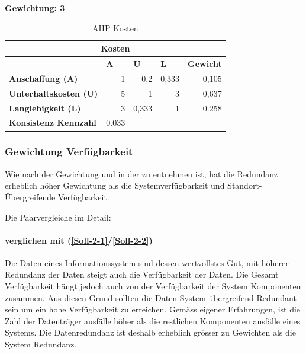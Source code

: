 \textbf{Gewichtung: 3}

\begin{table}[htbp]
\caption{AHP Kosten}
\begin{tabular}{|l|r|l|l|l|}
\hline
\multicolumn{ 5}{|c|}{\textbf{Kosten}} \\ \hline
 & \multicolumn{1}{l|}{\textbf{A}} & \textbf{U} & \textbf{L} & \textbf{Gewicht} \\ \hline
\textbf{Anschaffung (A)} & 1 & \multicolumn{1}{r|}{0,2} & \multicolumn{1}{r|}{0,333} & \multicolumn{1}{r|}{0,105} \\ \hline
\textbf{Unterhaltskosten (U)} & 5 & \multicolumn{1}{r|}{1} & \multicolumn{1}{r|}{3} & \multicolumn{1}{r|}{0,637} \\ \hline
\textbf{Langlebigkeit (L)} & 3 & \multicolumn{1}{r|}{0,333} & \multicolumn{1}{r|}{1} & \multicolumn{1}{r|}{0.258} \\ \hline
\textbf{Konsistenz Kennzahl} & 0.033 \\ \cline{1-2}
\end{tabular}
\label{tab:AHPKosten}
\end{table}

\subsubsection{Gewichtung Verfügbarkeit}

Wie nach der Gewichtung und in der  zu entnehmen ist, hat die Redundanz erheblich höher Gewichtung als die Systemverfügbarkeit und Standort-Übergreifende Verfügbarkeit.

Die Paarvergleiche im Detail:

\paragraph*{ verglichen mit  (\ref{Soll-2-1}/\ref{Soll-2-2})}
Die Daten eines Informationssystem sind dessen wertvollstes Gut, mit höherer Redundanz der Daten steigt auch die Verfügbarkeit der Daten.
Die Gesamt Verfügbarkeit hängt jedoch auch von der Verfügbarkeit der System Komponenten zusammen. Aus diesen Grund sollten die Daten System übergreifend Redundant sein um ein hohe Verfügbarkeit zu erreichen. Gemäss eigener Erfahrungen, ist die Zahl der Datenträger ausfälle höher als die restlichen Komponenten ausfälle eines Systems. Die Datenredundanz ist deshalb erheblich grösser zu Gewichten als die System Redundanz.


